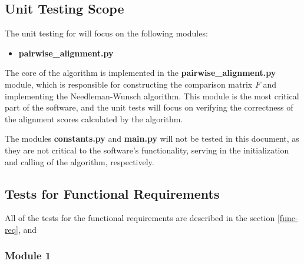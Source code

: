 \documentclass[12pt, titlepage]{article}
\begin{document}
\subsection{Unit Testing Scope}

The unit testing for \progname{} will focus on the following modules:
\begin{itemize}
  \item \textbf{pairwise\_alignment.py}
\end{itemize}

The core of the algorithm is implemented in the \textbf{pairwise\_alignment.py} module, 
which is responsible for constructing the comparison matrix $F$ and implementing the Needleman-Wunsch algorithm.
 This module is the most critical part of the software, and the unit tests will focus on verifying the correctness 
 of the alignment scores calculated by the algorithm. 

The modules \textbf{constants.py} and \textbf{main.py} will not be tested in this document, 
as they are not critical to the software's functionality, serving in the initialization and  
calling of the algorithm, respectively.


\subsection{Tests for Functional Requirements}

All of the tests for the functional requirements are described in the section \autoref{func-req}, and 


\subsubsection{Module 1}

\end{document}
